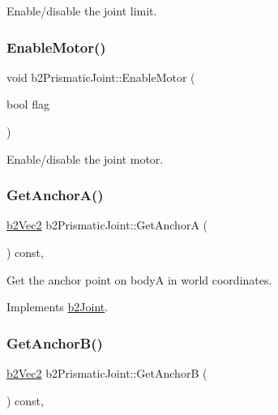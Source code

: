 Enable/disable the joint limit. 

\mbox{\label{classb2_prismatic_joint_a4a7fd079de49f7ed5aa4a5d8d90be2a2}} 
\subsubsection{\texorpdfstring{EnableMotor()}{EnableMotor()}}
{\footnotesize\ttfamily void b2\+Prismatic\+Joint\+::\+Enable\+Motor (\begin{DoxyParamCaption}\item[{bool}]{flag }\end{DoxyParamCaption})}



Enable/disable the joint motor. 

\mbox{\label{classb2_prismatic_joint_abb6649d2a18abb209f68d5255cd6c606}} 
\subsubsection{\texorpdfstring{GetAnchorA()}{GetAnchorA()}}
{\footnotesize\ttfamily \mbox{\hyperlink{structb2_vec2}{b2\+Vec2}} b2\+Prismatic\+Joint\+::\+Get\+AnchorA (\begin{DoxyParamCaption}{ }\end{DoxyParamCaption}) const\hspace{0.3cm}{\ttfamily [override]}, {\ttfamily [virtual]}}



Get the anchor point on bodyA in world coordinates. 



Implements \mbox{\hyperlink{classb2_joint_abe46ca3aad5db73909a9b5a7b2117447}{b2\+Joint}}.

\mbox{\label{classb2_prismatic_joint_a7e1d328bfd05895fd228c07bac41b9e5}} 
\subsubsection{\texorpdfstring{GetAnchorB()}{GetAnchorB()}}
{\footnotesize\ttfamily \mbox{\hyperlink{structb2_vec2}{b2\+Vec2}} b2\+Prismatic\+Joint\+::\+Get\+AnchorB (\begin{DoxyParamCaption}{ }\end{DoxyParamCaption}) const\hspace{0.3cm}{\ttfamily [override]}, {\ttfamily [virtual]}}



